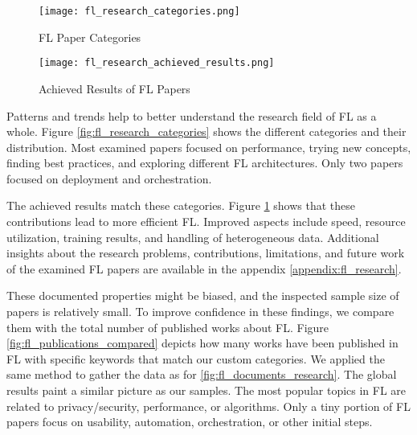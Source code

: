 \begin{figure}[p]
    \centering
    \texttt{[image: fl\_research\_categories.png]}
    \caption{FL Paper Categories}
    \label{fig:fl_research_categories}

    \texttt{[image: fl\_research\_achieved\_results.png]}
    \caption{Achieved Results of FL Papers}
    \label{fig:fl_research_achieved_results}
\end{figure}

Patterns and trends help to better understand the research field of FL as a whole.
Figure \ref{fig:fl_research_categories} shows the different categories and their distribution.
Most examined papers focused on performance, trying new concepts, finding best practices, and exploring different FL architectures.
Only two papers focused on deployment and orchestration.

The achieved results match these categories.
Figure \ref{fig:fl_research_achieved_results} shows that these contributions lead to more efficient FL.
Improved aspects include speed, resource utilization, training results, and handling of heterogeneous data.
Additional insights about the research problems, contributions, limitations, and future work of the examined FL papers are available in the appendix \ref{appendix:fl_research}.

These documented properties might be biased, and the inspected sample size of papers is relatively small.
To improve confidence in these findings, we compare them with the total number of published works about FL.
Figure \ref{fig:fl_publications_compared} depicts how many works have been published in FL with specific keywords that match our custom categories.
We applied the same method to gather the data as for \ref{fig:fl_documents_research}.
The global results paint a similar picture as our samples.
The most popular topics in FL are related to privacy/security, performance, or algorithms.
Only a tiny portion of FL papers focus on usability, automation, orchestration, or other initial steps.

